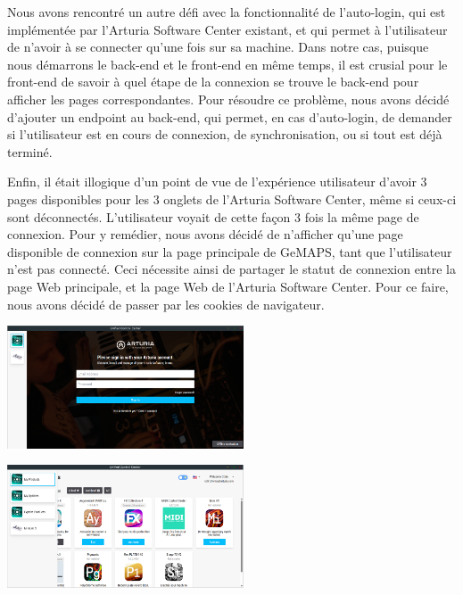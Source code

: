 \documentclass[francais]{rapportPFE}  %
\begin{document}
Nous avons rencontré un autre défi avec la fonctionnalité de l'auto-login, qui est implémentée par l'Arturia Software Center existant, et qui permet à l'utilisateur de n'avoir à se connecter qu'une fois sur sa machine. Dans notre cas, puisque nous démarrons le back-end et le front-end en même temps, il est crusial pour le front-end de savoir à quel étape de la connexion se trouve le back-end pour afficher les pages correspondantes. Pour résoudre ce problème, nous avons décidé d'ajouter un endpoint au back-end, qui permet, en cas d'auto-login, de demander si l'utilisateur est en cours de connexion, de synchronisation, ou si tout est déjà terminé.

Enfin, il était illogique d'un point de vue de l'expérience utilisateur d'avoir 3 pages disponibles pour les 3 onglets de l'Arturia Software Center, même si ceux-ci sont déconnectés. L'utilisateur voyait de cette façon 3 fois la même page de connexion. Pour y remédier, nous avons décidé de n'afficher qu'une page disponible de connexion sur la page principale de GeMAPS, tant que l'utilisateur n'est pas connecté. Ceci nécessite ainsi de partager le statut de connexion entre la page Web principale, et la page Web de l'Arturia Software Center. Pour ce faire, nous avons décidé de passer par les cookies de navigateur.

\begin{center}
    \centering
    \begin{minipage}{.5\textwidth}
    \centering
    \includegraphics[width=7cm]{graphics/disconnected.png}
    \label{fig:test1}
    \end{minipage}%
    \begin{minipage}{.5\textwidth}
    \centering
    \includegraphics[width=7cm]{graphics/connected.png}
    \label{fig:test2}
    \end{minipage}
    \end{center}
\end{document}
